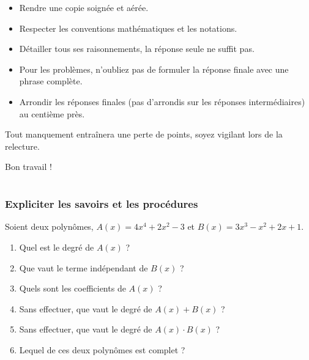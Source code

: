 \documentclass[a4paper, 12pt, parskip=half-, twoside=semi]{scrartcl}
\begin{document}
\pagestyle{empty}
\entete
{}
\begin{itemize}
    \item Rendre une copie soignée et aérée.
    \item Respecter les conventions mathématiques et les notations.
    \item Détailler tous ses raisonnements, la réponse seule ne suffit pas.
    \item Pour les problèmes, n'oubliez pas de formuler la réponse finale  avec une phrase complète.
    \item Arrondir les réponses finales (pas d'arrondis sur les réponses intermédiaires) au centième près.
\end{itemize}
 Tout manquement entraînera une perte de points, soyez vigilant lors de la relecture.
\vfill
\begin{flushright}
    Bon travail !
\end{flushright}
\cleardoublepage
\pagestyle{plain}
\setcounter{page}{1}
\part{}
\section*{ Expliciter les savoirs et les procédures}
\begin{connaitre}[points=3]
    Soient deux polynômes,
    \(A(x) = 4x^4 + 2x^2 - 3\) et \(B(x) = 3x^3 - x^2 + 2x + 1\).
    \begin{enumerate}
        \item Quel est le degré de \(A(x)\) ?
        \item Que vaut le terme indépendant de \(B(x)\) ?
        \item Quels sont les coefficients de \(A(x)\) ?
        \item Sans effectuer, que vaut le degré de \(A(x) + B(x)\) ?
        \item Sans effectuer, que vaut le degré de \(A(x) \cdot B(x)\) ?
        \item Lequel de ces deux polynômes est complet ?
    \end{enumerate}
\end{connaitre}
\end{document}
